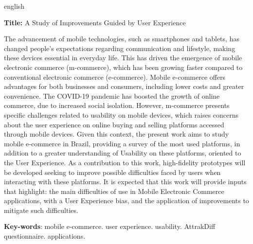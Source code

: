 \begin{resumo}[Abstract]
    \begin{otherlanguage*}{english}

    \textbf{Title:} A Study of Improvements Guided by User Experience

    The advancement of mobile technologies, such as smartphones and tablets, has changed people's expectations regarding communication and lifestyle, making these devices essential in everyday life. This has driven the emergence of mobile electronic commerce (m-commerce), which has been growing faster compared to conventional electronic commerce (e-commerce). Mobile e-commerce offers advantages for both businesses and consumers, including lower costs and greater convenience. The COVID-19 pandemic has boosted the growth of online commerce, due to increased social isolation. However, m-commerce presents specific challenges related to usability on mobile devices, which raises concerns about the user experience on online buying and selling platforms accessed through mobile devices. Given this context, the present work aims to study mobile e-commerce in Brazil, providing a survey of the most used platforms, in addition to a greater understanding of Usability on these platforms, oriented to the User Experience. As a contribution to this work, high-fidelity prototypes will be developed seeking to improve possible difficulties faced by users when interacting with these platforms. It is expected that this work will provide inputs that highlight: the main difficulties of use in Mobile Electronic Commerce applications, with a User Experience bias, and the application of improvements to mitigate such difficulties.

   \vspace{\onelineskip}
 
   \noindent 
   \textbf{Key-words}: mobile e-commerce. user experience. usability. AttrakDiff questionnaire. applications.
 \end{otherlanguage*}
 
\end{resumo}
